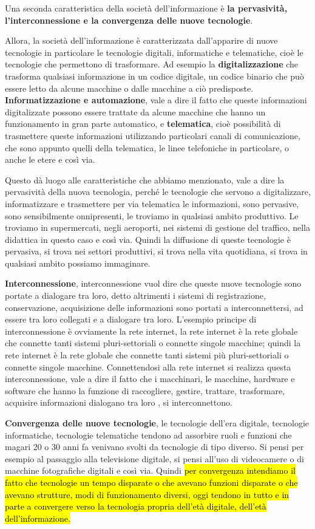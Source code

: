 Una seconda caratteristica della società dell'informazione è \textbf{la pervasività, l'interconnessione e la convergenza delle nuove tecnologie}.\par
Allora, la società dell'informazione è caratterizzata dall'apparire di nuove tecnologie in particolare le tecnologie digitali, informatiche e telematiche, cioè le tecnologie che permettono di trasformare. Ad esempio la \textbf{digitalizzazione} che trasforma qualsiasi informazione in un codice digitale, un codice binario che può essere letto da alcune macchine o dalle macchine a ciò predisposte. 
\textbf{Informatizzazione e automazione}, vale a dire il fatto che queste informazioni digitalizzate possono essere trattate da alcune macchine che hanno un funzionamento in gran parte automatico, e \textbf{telematica}, cioè possibilità di trasmettere queste informazioni utilizzando particolari canali di comunicazione, che sono appunto quelli della telematica, le linee telefoniche in particolare, o anche le etere e così via. \par
Questo dà luogo alle caratteristiche che abbiamo menzionato, vale a dire la pervasività della nuova tecnologia, perché le tecnologie che servono a digitalizzare, informatizzare e trasmettere per via telematica le informazioni, sono pervasive, sono sensibilmente onnipresenti, le troviamo in qualsiasi ambito produttivo. Le troviamo in supermercati, negli aeroporti, nei sistemi di gestione del traffico, nella didattica in questo caso e così via. Quindi la diffusione di queste tecnologie è pervasiva, si trova nei settori produttivi, si trova nella vita quotidiana, si trova in qualsiasi ambito possiamo immaginare.\par
\textbf{Interconnessione}, interconnessione vuol dire che queste nuove tecnologie sono portate a dialogare tra loro, detto altrimenti i sistemi di registrazione, conservazione, acquisizione delle informazioni sono portati a interconnettersi, ad essere tra loro collegati e a dialogare tra loro. L'esempio principe di interconnessione è ovviamente la rete internet, la rete internet è la rete globale che connette tanti sistemi pluri-settoriali o connette singole macchine; quindi la rete internet è la rete globale che connette tanti sistemi più pluri-settoriali o connette singole macchine. Connettendosi alla rete internet si realizza questa interconnessione, vale a dire il fatto che i macchinari, le macchine, hardware e software che hanno la funzione di raccogliere, gestire, trattare, trasformare, acquisire informazioni dialogano tra loro , si interconnettono.\par
\textbf{Convergenza delle nuove tecnologie}, le tecnologie dell'era digitale, tecnologie informatiche, tecnologie telematiche tendono ad assorbire ruoli e funzioni che magari 20 o 30 anni fa venivano svolti da tecnologie di tipo diverso. Si pensi per esempio al passaggio alla televisione digitale, si pensi all'uso di videocamere o di macchine fotografiche digitali e così via. Quindi \hl{per convergenza intendiamo il fatto che tecnologie un tempo disparate o che avevano funzioni disparate o che avevano strutture, modi di funzionamento diversi, oggi tendono in tutto e in parte a convergere verso la tecnologia propria dell'età digitale, dell'età dell'informazione.} \par

